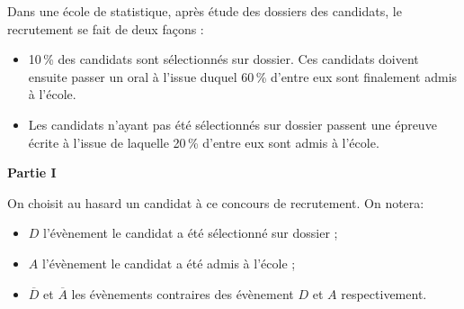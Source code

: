\medskip

Dans une école de statistique, après étude des dossiers des candidats, le recrutement se fait de deux façons :

\setlength\parindent{1cm}
\begin{itemize}
\item[$\bullet~~$] 10\,\% des candidats sont sélectionnés sur dossier. Ces candidats doivent ensuite passer un oral à l'issue duquel 60\,\% d'entre eux sont finalement admis à l'école.
\item[$\bullet~~$] Les candidats n'ayant pas été sélectionnés sur dossier passent une épreuve écrite à l'issue de laquelle 20\,\% d'entre eux sont admis à l'école.
\end{itemize}
\setlength\parindent{0cm}



\begin{center}
\textbf{Partie I}
\end{center}

On choisit au hasard un candidat à ce concours de recrutement. On notera:

\setlength\parindent{1cm}
\begin{itemize}
\item[$\bullet~~$] $D$ l'évènement \og le candidat a été sélectionné sur dossier \fg{} ;
\item[$\bullet~~$] $A$ l'évènement \og le candidat a été admis à l'école \fg{} ;
\item[$\bullet~~$] $\overline{D}$ et $\overline{A}$ les évènements contraires des évènement $D$ et $A$ respectivement.
\end{itemize}
\setlength\parindent{0cm}

\medskip

